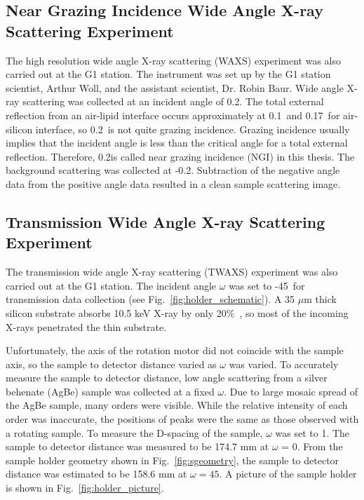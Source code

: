 \subsection{Near Grazing Incidence Wide Angle X-ray Scattering Experiment}
\label{NGIWAXS_method}
The high resolution wide angle X-ray scattering (WAXS)
experiment was also carried out at the G1 station. 
The instrument was set up by the G1
station scientist, Arthur Woll, and the assistant scientist, Dr. Robin Baur.
Wide angle X-ray scattering was collected at an incident angle of 0.2\textdegree. 
The total external reflection from an air-lipid interface occurs approximately 
at 0.1\textdegree\ and 0.17\textdegree\ for air-silicon interface, 
so 0.2\textdegree\ is not quite grazing incidence.
Grazing incidence usually implies that the incident angle is less than the 
critical angle for a total external reflection.
Therefore, 0.2\textdegree is called near grazing incidence (NGI) in this thesis.
The background scattering was collected at -0.2\textdegree. Subtraction
of the negative angle data from the positive angle data resulted in 
a clean sample scattering image.


\subsection{Transmission Wide Angle X-ray Scattering Experiment}
\label{TWAXS_method}
The transmission wide angle X-ray scattering (TWAXS) experiment was also 
carried out at the G1 station.
The incident angle $\omega$ was set to -45\textdegree\ for transmission data
collection (see Fig.~\ref{fig:holder_schematic}). 
A 35 $\mu$m thick silicon substrate absorbs 10.5 keV X-ray 
by only 20\%\ \cite{ref:cxro}, so most of the incoming X-rays penetrated
the thin substrate. 
 
Unfortunately,
the axis of the rotation motor did not coincide with the sample axis, so
the sample to detector distance varied as $\omega$ was varied. To accurately
measure the sample to detector distance, low angle scattering from a 
silver behenate (AgBe) sample was collected
at a fixed $\omega$. Due to large mosaic spread of the AgBe sample, many orders were
visible. While the relative intensity of each order was inaccurate, 
the positions of peaks were the same as those observed with a rotating sample.
To measure the D-spacing of the sample, $\omega$ was set to 1\textdegree.
The sample to detector distance was measured to be 174.7 mm 
at $\omega$ = 0\textdegree.
From the sample holder geometry shown in Fig.~\ref{fig:sgeometry},
the sample to detector distance was estimated to be 
158.6 mm at $\omega=45$\textdegree.
A picture of the sample holder is shown in Fig.~\ref{fig:holder_picture}.

